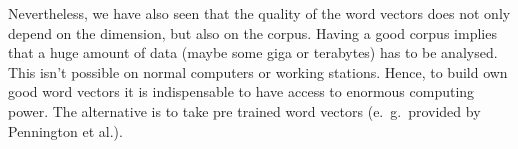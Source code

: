 Nevertheless, we have also seen that the quality of the word vectors does not only depend on the dimension, but
also on the corpus. Having a good corpus implies that a huge amount of data (maybe some giga or terabytes) has
to be analysed. This isn't possible on normal computers or working stations. Hence, to build own good word vectors
it is indispensable to have access to enormous computing power. The alternative is to take pre trained word 
vectors (e.~g.~provided by Pennington et al.).
%
